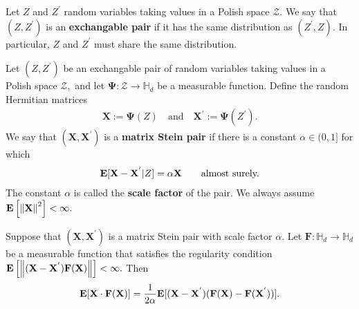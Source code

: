 \begin{definition}
  Let 
  $Z$ and $Z^{'}$
  random variables taking values
  in a Polish space $\mathcal{Z}.$
  We say that
  $
  (
    Z
    ,
    Z^{'}
  )
  $
  is an \textbf{exchangable pair}
  if it has the same distribution as 
  $
  (
  Z^{'}
    ,
    Z
  )
  .
  $
  In particular, 
  $Z$ and $Z^{'}$
  must share the same distribution.

\end{definition}
\begin{definition}
  Let
  $
  (
    Z
    ,
    Z^{'}
  )
  $
  be an exchangable pair of random variables taking values
  in a Polish space $\mathcal{Z},$
  and let 
  $
    \mathbf{\Psi}
    : 
    \mathcal{Z}
    \to 
  \mathbb{H}_d
  $
  be a measurable function.
  Define the random Hermitian matrices
  \begin{gather}
    \mathbf{X}
    :=
    \mathbf{\Psi}
    (Z)
    \quad
    \text{and}
    \quad
    \mathbf{X}^{'}
    :=
    \mathbf{\Psi}
    (Z^{'})
    .
  \end{gather}
  We say that 
  $
  (
    \mathbf{X}
    ,
    \mathbf{X}^{'}
  )
  $
  is a \textbf{matrix Stein pair}
  if there is a constant 
  $\alpha\in (0,1]$
  for which
  \begin{gather}
    \mathbf{E}[
    \mathbf{X}
    -
    \mathbf{X}^{'}
    \vert
    Z
    ]
    =
    \alpha 
    \mathbf{X}
    \qquad
    \text{almost surely.}
  \end{gather}
  The constant 
  $\alpha$
  is called the \textbf{scale factor} of the pair.
  We always assume 
  $
    \mathbf{E}
    \left[ 
      \left\lVert\mathbf{X}\right\rVert^2
    \right]
    <
    \infty
    .
  $
\end{definition}

\begin{lemma}
  Suppose that
  $
  (
    \mathbf{X}
    ,
    \mathbf{X}^{'}
  )
  $
  is a matrix Stein pair with scale factor $\alpha.$
  Let 
  $
    \mathbf{F}
    :
    \mathbb{H}_d
    \to
    \mathbb{H}_d
  $
  be a measurable function that satisfies the regularity condition
  $
  \mathbf{E}
  \left[
  \left\lVert
    (
    \mathbf{X}
    -
    \mathbf{X}^{'}
  )
  \mathbf{F}(\mathbf{X})
  \right\rVert
  \right]
  <
  \infty
  .
  $
  Then
\begin{gather}
  \mathbf{E}
  [
    \mathbf{X}
    \cdot
    \mathbf{F}
    (\mathbf{X})
  ]
  =
  \frac{1}{2\alpha}
  \mathbf{E}
  [
    (
    \mathbf{X}
    -
    \mathbf{X}^{'}
    )
    (
    \mathbf{F}
    (
    \mathbf{X}
    )
    -
    \mathbf{F}
    (
    \mathbf{X}^{'}
    )
  )
  ]
  .
\end{gather}
\end{lemma}
